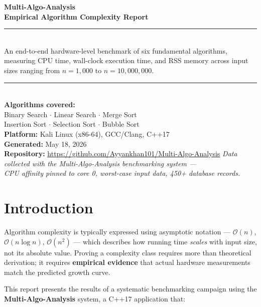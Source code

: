 \documentclass[12pt,a4paper]{report}
\newcommand{\On}[1]{\ensuremath{\mathcal{O}(#1)}}
\begin{document}
\begin{titlepage}
  \centering
  \vspace*{2cm}
  {\color{headerblue}\Huge\bfseries Multi-Algo-Analysis\\[0.4em]}
  {\Large\bfseries Empirical Algorithm Complexity Report\\[2em]}
  \rule{\linewidth}{1pt}\\[1.5em]
  {\large
    An end-to-end hardware-level benchmark of six fundamental algorithms,
    measuring CPU time, wall-clock execution time, and RSS memory
    across input sizes ranging from $n = 1{,}000$ to $n = 10{,}000{,}000$.\\[2em]
  }
  \rule{\linewidth}{1pt}\\[2em]
  {\large
    \textbf{Algorithms covered:}\\[0.5em]
    Binary Search \quad $\cdot$ \quad Linear Search \quad $\cdot$ \quad Merge Sort\\[0.3em]
    Insertion Sort \quad $\cdot$ \quad Selection Sort \quad $\cdot$ \quad Bubble Sort
  }\\[3em]
  {\large
    \textbf{Platform:} Kali Linux (x86-64), GCC/Clang, C++17\\[0.3em]
    \textbf{Generated:} May 18, 2026\\[0.3em]
    \textbf{Repository:} \url{https://github.com/Ayyankhan101/Multi-Algo-Analysis}
  }
  \vfill
  {\large\textit{Data collected with the Multi-Algo-Analysis benchmarking system ---\\
  CPU affinity pinned to core 0, worst-case input data, 450+ database records.}}
\end{titlepage}

\tableofcontents
\newpage

\chapter{Introduction}
\label{chap:intro}

Algorithm complexity is typically expressed using asymptotic notation --- \On{n},
\On{n \log n}, \On{n^2} --- which describes how running time \emph{scales} with
input size, not its absolute value. Proving a complexity class requires more than
theoretical derivation; it requires \textbf{empirical evidence} that actual hardware
measurements match the predicted growth curve.

This report presents the results of a systematic benchmarking campaign using the
\textbf{Multi-Algo-Analysis} system, a C++17 application that:
\end{document}
